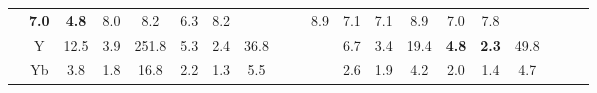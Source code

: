 \documentclass[french,10pt]{article}
\begin{document}
\begin{landscape}
\begin{longtable}{ l  c | c c c | c c c | c c c | c c c | c c c | c c c | }
                    &                     \textbf{ 7.0}
     & {\footnotesize     \textbf{ 4.8}
    } & {\footnotesize     8.0
     }
    
    
                    &                     8.2
     & {\footnotesize     6.3
    } & {\footnotesize     8.2
     }
    
    
                    & & &

                    &                     8.9
     & {\footnotesize     7.1
    } & {\footnotesize     7.1
     }
    
    
                    &                     8.9
     & {\footnotesize     7.0
    } & {\footnotesize     7.8
     }
    
    
                    & & &

                    \\*
                        & {\small Y  }

                    &                     12.5
     & {\footnotesize     3.9
    } & {\footnotesize     251.8
     }
    
    
                    &                     5.3
     & {\footnotesize     2.4
    } & {\footnotesize     36.8
     }
    
    
                    & & &

                    &                     6.7
     & {\footnotesize     3.4
    } & {\footnotesize     19.4
     }
    
    
                    &                     \textbf{ 4.8}
     & {\footnotesize     \textbf{ 2.3}
    } & {\footnotesize     49.8
     }
    
    
                    & & &

                    \\*
                        & {\small Yb  }

                    &                     3.8
     & {\footnotesize     1.8
    } & {\footnotesize     16.8
     }
    
    
                    &                     2.2
     & {\footnotesize     1.3
    } & {\footnotesize     5.5
     }
    
    
                    & & &

                    &                     2.6
     & {\footnotesize     1.9
    } & {\footnotesize     4.2
     }
    
    
                    &                     2.0
     & {\footnotesize     1.4
    } & {\footnotesize     4.7
     }
    

\end{longtable}
\end{landscape}
\end{document}
